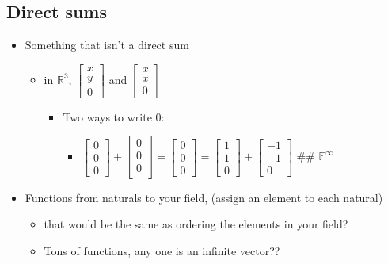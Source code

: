 \documentclass[letterpaper]{article}
\begin{document}
\subsection{Direct sums}
\label{sec:orgccc8999}
\begin{itemize}
\item Something that isn't a direct sum

\begin{itemize}
\item in \(\mathbb{R}^3\), \(\begin{bmatrix}x\\y\\0\end{bmatrix}\) and
\(\begin{bmatrix}x\\x\\0\end{bmatrix}\)

\begin{itemize}
\item Two ways to write \(0\):

\begin{itemize}
\item \(\begin{bmatrix}0\\0\\0\end{bmatrix} + \begin{bmatrix}0\\0\\0\\\end{bmatrix} = \begin{bmatrix}0\\0\\0\end{bmatrix} = \begin{bmatrix}1\\1\\0\end{bmatrix} + \begin{bmatrix}-1\\-1\\0\end{bmatrix}\)
\#\# \(\mathbb{F}^\infty\)
\end{itemize}
\end{itemize}
\end{itemize}

\item Functions from naturals to your field, (assign an element to each
natural)

\begin{itemize}
\item that would be the same as ordering the elements in your field?
\item Tons of functions, any one is an infinite vector??
\end{itemize}
\end{itemize}
\end{document}
